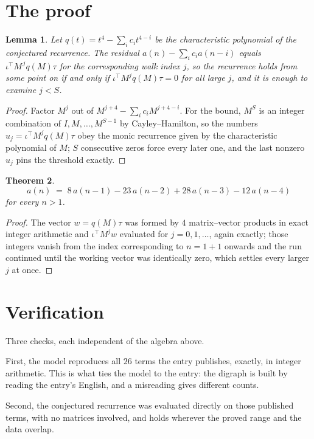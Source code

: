 \documentclass[11pt,a4paper]{article}
\theoremstyle{plain}
\newtheorem{theorem}{Theorem}
\newtheorem{lemma}[theorem]{Lemma}
\theoremstyle{definition}
\begin{document}
\section{The proof}

\begin{lemma}\label{lem:crit}
Let $q(t)=t^{4}-\sum_i c_it^{4-i}$ be the characteristic polynomial of the
conjectured recurrence. The residual $a(n)-\sum_ic_ia(n-i)$ equals
$\iota^{\!\top}M^{\,j}q(M)\tau$ for the corresponding walk index $j$, so the recurrence
holds from some point on if and only if $\iota^{\!\top}M^{j}q(M)\tau=0$ for all large $j$,
and it is enough to examine $j<S$.
\end{lemma}

\begin{proof}
Factor $M^{j}$ out of $M^{j+4}-\sum_ic_iM^{j+4-i}$. For the bound, $M^{S}$
is an integer combination of $I,M,\dots,M^{S-1}$ by Cayley--Hamilton, so the numbers
$u_j=\iota^{\!\top}M^{j}q(M)\tau$ obey the monic recurrence given by the characteristic
polynomial of $M$; $S$ consecutive zeros force every later one, and the last nonzero $u_j$
pins the threshold exactly.
\end{proof}

\begin{theorem}
\[
a(n)\;=\;8\,a(n-1) - 23\,a(n-2) + 28\,a(n-3) - 12\,a(n-4)
\]
for every $n>1$.
\end{theorem}

\begin{proof}
The vector $w=q(M)\tau$ was formed by $4$ matrix--vector products in exact integer
arithmetic and $\iota^{\!\top}M^{j}w$ evaluated for $j=0,1,\dots$, again exactly; those
integers vanish from the index corresponding to $n=1+1$ onwards and the run continued
until the working vector was identically zero, which settles every larger $j$ at once.
\end{proof}

\section{Verification}

Three checks, each independent of the algebra above.

First, the model reproduces all $26$ terms the entry publishes, exactly, in integer
arithmetic. This is what ties the model to the entry: the digraph is built by reading the
entry's English, and a misreading gives different counts.

Second, the conjectured recurrence was evaluated directly on those published terms, with no
matrices involved, and holds wherever the proved range and the data overlap.
\end{document}
